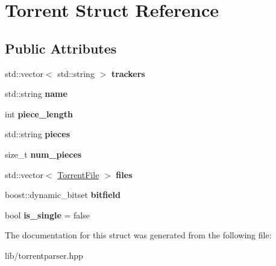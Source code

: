 \hypertarget{structTorrent}{}\section{Torrent Struct Reference}
\label{structTorrent}
\subsection*{Public Attributes}
\begin{DoxyCompactItemize}
\item 
\mbox{\label{structTorrent_a634e08dc5c95e76117074acb5f633a90}} 
std\+::vector$<$ std\+::string $>$ {\bfseries trackers}
\item 
\mbox{\label{structTorrent_af0f3f1ae144a53edfd6f526abe35911a}} 
std\+::string {\bfseries name}
\item 
\mbox{\label{structTorrent_af35506b5ff7dfa2479dfafa5db46ccb7}} 
int {\bfseries piece\+\_\+length}
\item 
\mbox{\label{structTorrent_adf5e9b81258493066f0649348fec1383}} 
std\+::string {\bfseries pieces}
\item 
\mbox{\label{structTorrent_a3f559e759bb388621ed3ca287e0dce4b}} 
size\+\_\+t {\bfseries num\+\_\+pieces}
\item 
\mbox{\label{structTorrent_a3cf53601cc00765215995fc7f093e5cd}} 
std\+::vector$<$ \hyperlink{structTorrentFile}{Torrent\+File} $>$ {\bfseries files}
\item 
\mbox{\label{structTorrent_a8c811cd46d8935b7c25f00c9819463c2}} 
boost\+::dynamic\+\_\+bitset {\bfseries bitfield}
\item 
\mbox{\label{structTorrent_a9745fb134056ea76dc14cdbd11b58f3e}} 
bool {\bfseries is\+\_\+single} = false
\end{DoxyCompactItemize}


The documentation for this struct was generated from the following file\+:\begin{DoxyCompactItemize}
\item 
lib/torrentparser.\+hpp\end{DoxyCompactItemize}
